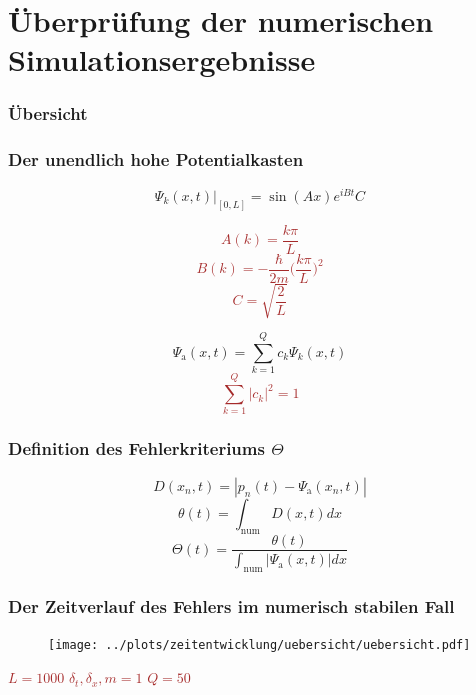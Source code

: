 \documentclass{beamer}
\begin{document}
\section{Überprüfung der numerischen Simulationsergebnisse}
\begin{frame}
\frametitle{Übersicht}
\tableofcontents[currentsection]
\end{frame}
\begin{frame}
	\frametitle{Der unendlich hohe Potentialkasten}
	\begin{equation*}
		\Psi_k(x, t)\big|_{[0, L]} = \sin(A x) e^{i B t}  C
	\end{equation*}
	\textcolor{brown}{
		\begin{multicols}{3}
			\noindent
			\begin{equation*}
			A(k) = \frac{k \pi}{L}
			\end{equation*}
			\begin{equation*}
			B(k) = -\frac{\hbar}{2m}\bigg(\frac{k \pi}{L}\bigg)^2
			\end{equation*}
			\begin{equation*}
			C = \sqrt{\frac{2}{L}}
			\end{equation*}
		\end{multicols}
	}
\pause
	\begin{equation*}
	\Psi_\text{a}(x, t) = \sum_{k = 1}^{Q}c_k \Psi_k(x, t)
	\end{equation*}
	\textcolor{brown}{
		\begin{equation*}
		\sum_{k = 1}^{Q}|c_k|^2 = 1
		\end{equation*}
	}
\end{frame}
\begin{frame}
\frametitle{Definition des Fehlerkriteriums \(\Theta\)}
\begin{equation}
D(x_n, t) = |p_n(t) - \Psi_\text{a}(x_n, t)|
\end{equation}
\pause
\begin{equation}
\theta(t) = \int_{\text{num}}D(x, t)dx
\label{durchschnittsabweichung}
\end{equation}
\pause
\begin{equation}
\Theta(t) = \frac{\theta(t)}{\int_\text{num} |\Psi_\text{a}(x, t)|dx}
\end{equation}

\end{frame}
\begin{frame}
	\frametitle{Der Zeitverlauf des Fehlers im numerisch stabilen Fall}	
\begin{figure}
	\texttt{[image: ../plots/zeitentwicklung/uebersicht/uebersicht.pdf]}
	\label{konvergenzzeitentwicklung}
\end{figure}
\textcolor{brown}{
\(L = 1000\)\hspace{3em} \( \delta_t, \delta_x, m = 1\)\hspace{3em} \(Q = 50\)
}
\end{frame}
\end{document}
